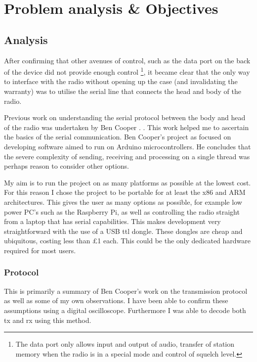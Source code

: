\chapter{Problem analysis \& Objectives}
\section{Analysis}

After confirming that other avenues of control, such as the data port on the back of the device did not provide enough control \footnote{The data port only allows input and output of audio, transfer of station memory when the radio is in a special mode and control of squelch level.}, it became clear that the only way to interface with the radio without opening up the case (and invalidating the warranty) was to utilise the serial line that connects the head and body of the radio.

Previous work on understanding the serial protocol between the body and head of the radio was undertaken by Ben Cooper \cite{ben_report}. . This work helped me to ascertain the basics of the serial communication. Ben Cooper's project as focused on developing software aimed to run on Arduino microcontrollers. He concludes that the severe complexity of sending, receiving and processing on a single thread was perhaps reason to consider other options.

My aim is to run the project on as many platforms as possible at the lowest cost. For this reason I chose the project to be portable for at least the x86 and ARM architectures. This gives the user as many options as possible, for example low power PC's such as the Raspberry Pi, as well as controlling the radio straight from a laptop that has serial capabilities. This makes development very straightforward with the use of a USB \gls{ttl} dongle. These dongles are cheap and ubiquitous, costing less than \pounds1 each. This could be the only dedicated hardware required for most users.

\subsection{Protocol}
This is primarily a summary of Ben Cooper's work\cite{ben_report} on the transmission protocol as well as some of my own observations. I have been able to confirm these assumptions using a digital oscilloscope. Furthermore I was able to decode both \gls{tx} and \gls{rx} using this method.

